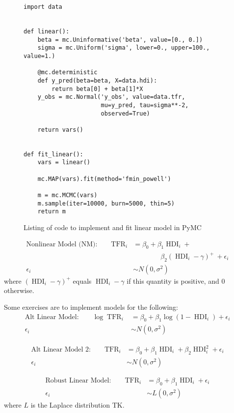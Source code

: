 \documentclass[10pt]{bmc_article}
\def\TFR{\operatorname{TFR}}
\def\HDI{\operatorname{HDI}}
\newenvironment{bmcformat}{\begin{raggedright}\baselineskip20pt\sloppy\setboolean{publ}{false}}{\end{raggedright}\baselineskip20pt\sloppy}
\begin{document}
\begin{bmcformat}
\begin{figure}
\begin{verbatim}
import data


def linear():
    beta = mc.Uninformative('beta', value=[0., 0.])
    sigma = mc.Uniform('sigma', lower=0., upper=100., value=1.)

    @mc.deterministic
    def y_pred(beta=beta, X=data.hdi):
        return beta[0] + beta[1]*X
    y_obs = mc.Normal('y_obs', value=data.tfr,
                      mu=y_pred, tau=sigma**-2,
                      observed=True)

    return vars()


def fit_linear():
    vars = linear()

    mc.MAP(vars).fit(method='fmin_powell')

    m = mc.MCMC(vars)
    m.sample(iter=10000, burn=5000, thin=5)
    return m
\end{verbatim}
\caption{Listing of code to implement and fit linear model in PyMC}
\label{src/linear model}
\end{figure}

\begin{align*}
\text{Nonlinear Model (NM):}\qquad
\TFR_i &= \beta_0 + \beta_1 \HDI_i + \\
&\qquad \qquad\beta_2(\HDI_i - \gamma)^+ \ + \epsilon_i\\
\epsilon_i &\sim N(0, \sigma^2)
\end{align*}
where $(\HDI_i - \gamma)^+$ equals $\HDI_i - \gamma$ if this quantity
is positive, and $0$ otherwise.


Some exercises are to implement models for the following:
\begin{align*}
\text{Alt Linear Model:}\qquad
\log\TFR_i &= \beta_0 + \beta_1 \log(1-\HDI_i) + \epsilon_i\\
\epsilon_i &\sim N(0, \sigma^2)
\end{align*}

\begin{align*}
\text{Alt Linear Model 2:}\qquad
\TFR_i &= \beta_0 + \beta_1 \HDI_i + \beta_2 \HDI_i^2 + \epsilon_i\\
\epsilon_i &\sim N(0, \sigma^2)
\end{align*}

\begin{align*}
\text{Robust Linear Model:}\qquad
\TFR_i &= \beta_0 + \beta_1 \HDI_i + \epsilon_i\\
\epsilon_i &\sim L(0, \sigma^2)
\end{align*}
where $L$ is the Laplace distribution TK.



\end{bmcformat}
\end{document}
